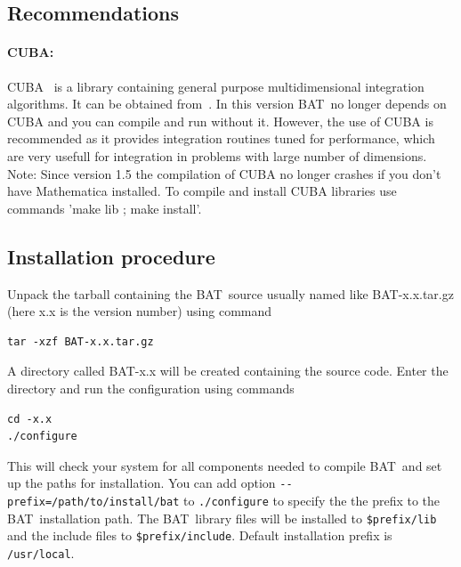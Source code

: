 \documentclass[11pt, a4paper]{article}
\newcommand{\bat}{{\sc BAT}}
\begin{document}

\subsection{Recommendations}

\paragraph{CUBA:}
CUBA~\cite{CUBA} is a library containing general purpose
multidimensional integration algorithms. It can be obtained
from~\cite{CUBAweb}. In this version \bat\ no longer depends on CUBA
and you can compile and run without it. However, the use of CUBA is
recommended as it provides integration routines tuned for performance,
which are very usefull for integration in problems with large number
of dimensions. \\

Note: Since version 1.5 the compilation of CUBA no longer crashes if
you don't have Mathematica installed. To compile and install CUBA
libraries use commands 'make lib ; make install'.


\subsection{Installation procedure}

Unpack the tarball containing the \bat\ source usually named like
BAT-x.x.tar.gz (here x.x is the version number) using command
%
\begin{verbatim}
tar -xzf BAT-x.x.tar.gz
\end{verbatim}
%
A directory called BAT-x.x will be created containing the source code.
Enter the directory and run the configuration using commands
%
\begin{verbatim}
cd -x.x
./configure
\end{verbatim}

This will check your system for all components needed to compile \bat\
and set up the paths for installation. You can add option
\verb|--prefix=/path/to/install/bat| to \verb|./configure| to specify
the the prefix to the \bat\ installation path. The \bat\ library files
will be installed to \verb|$prefix/lib| and the include files to
\verb|$prefix/include|. Default installation prefix is
\verb|/usr/local|. \\ 
\end{document}
